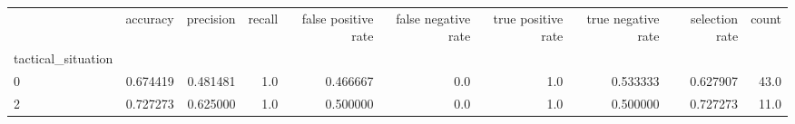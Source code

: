 \begin{tabular}{lrrrrrrrrr}
\toprule
{} &  accuracy &  precision &  recall &  false positive rate &  false negative rate &  true positive rate &  true negative rate &  selection rate &  count \\
tactical\_situation &           &            &         &                      &                      &                     &                     &                 &        \\
\midrule
0                  &  0.674419 &   0.481481 &     1.0 &             0.466667 &                  0.0 &                 1.0 &            0.533333 &        0.627907 &   43.0 \\
2                  &  0.727273 &   0.625000 &     1.0 &             0.500000 &                  0.0 &                 1.0 &            0.500000 &        0.727273 &   11.0 \\
\bottomrule
\end{tabular}
